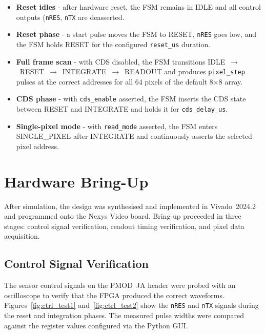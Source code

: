 \begin{itemize}
    \item \textbf{Reset idles} - after hardware reset, the FSM remains in IDLE and all control outputs (\texttt{nRES}, \texttt{nTX} are deasserted.
    \item \textbf{Reset phase} - a start pulse moves the FSM to RESET, \texttt{nRES} goes low, and the FSM holds RESET for the configured \texttt{reset\_us} duration.
    \item \textbf{Full frame scan} - with CDS disabled, the FSM transitions IDLE~$\to$~RESET~$\to$~INTEGRATE~$\to$~READOUT and produces \texttt{pixel\_step} pulses at the correct addresses for all 64 pixels of the default 8$\times$8 array.
    \item \textbf{CDS phase} - with \texttt{cds\_enable} asserted, the FSM inserts the CDS state between RESET and INTEGRATE and holds it for \texttt{cds\_delay\_us}.
    \item \textbf{Single-pixel mode} - with \texttt{read\_mode} asserted, the FSM enters SINGLE\_PIXEL after INTEGRATE and continuously asserts the selected pixel address.
\end{itemize}


\section{Hardware Bring-Up}

After simulation, the design was synthesised and implemented in Vivado~2024.2 and programmed onto the Nexys Video board. Bring-up proceeded in three stages: control signal verification, readout timing verification, and pixel data acquisition.

\subsection{Control Signal Verification}

The sensor control signals on the PMOD~JA header were probed with an oscilloscope to verify that the FPGA produced the correct waveforms. Figures~\ref{fig:ctrl_test1} and~\ref{fig:ctrl_test2} show the \texttt{nRES} and \texttt{nTX} signals during the reset and integration phases. The measured pulse widths were compared against the register values configured via the Python GUI.

